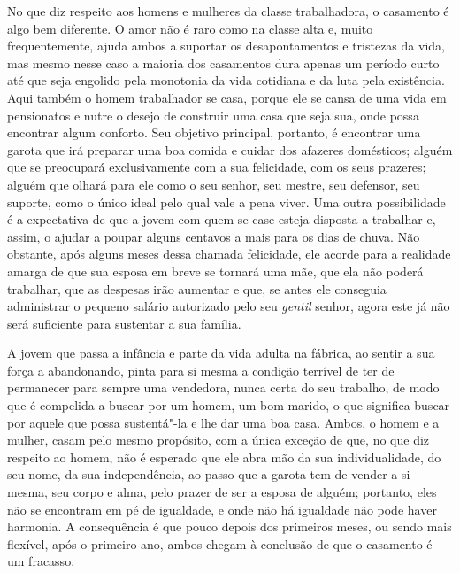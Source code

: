 No que diz respeito aos homens e mulheres da classe trabalhadora, o
casamento é algo bem diferente. O amor não é raro como na classe alta e,
muito frequentemente, ajuda ambos a suportar os desapontamentos e
tristezas da vida, mas mesmo nesse caso a maioria dos casamentos dura
apenas um período curto até que seja engolido pela monotonia da vida
cotidiana e da luta pela existência. Aqui também o homem trabalhador se
casa, porque ele se cansa de uma vida em pensionatos e nutre o desejo de
construir uma casa que seja sua, onde possa encontrar algum conforto.
Seu objetivo principal, portanto, é encontrar uma garota que irá
preparar uma boa comida e cuidar dos afazeres domésticos; alguém que se
preocupará exclusivamente com a sua felicidade, com os seus prazeres;
alguém que olhará para ele como o seu senhor, seu mestre, seu defensor,
seu suporte, como o único ideal pelo qual vale a pena viver. Uma outra
possibilidade é a expectativa de que a jovem com quem se case esteja
disposta a trabalhar e, assim, o ajudar a poupar alguns centavos a mais
para os dias de chuva. Não obstante, após alguns meses dessa chamada
felicidade, ele acorde para a realidade amarga de que sua esposa em
breve se tornará uma mãe, que ela não poderá trabalhar, que as despesas
irão aumentar e que, se antes ele conseguia administrar o pequeno salário
autorizado pelo seu \textit{gentil} senhor, agora este já não será suficiente
para sustentar a sua família.

A jovem que passa a infância e parte da vida adulta na fábrica, ao
sentir a sua força a abandonando, pinta para si mesma a condição
terrível de ter de permanecer para sempre uma vendedora, nunca certa do
seu trabalho, de modo que é compelida a buscar por um homem, um bom
marido, o que significa buscar por aquele que possa sustentá"-la e lhe
dar uma boa casa. Ambos, o homem e a mulher, casam pelo mesmo propósito,
com a única exceção de que, no que diz respeito ao homem, não é esperado
que ele abra mão da sua individualidade, do seu nome, da sua
independência, ao passo que a garota tem de vender a si mesma, seu corpo
e alma, pelo prazer de ser a esposa de alguém; portanto, eles não se
encontram em pé de igualdade, e onde não há igualdade não pode haver
harmonia. A consequência é que pouco depois dos primeiros meses, ou
sendo mais flexível, após o primeiro ano, ambos chegam à conclusão de
que o casamento é um fracasso.

